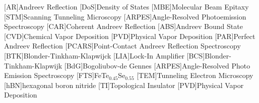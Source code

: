 [AR]{Andreev Reflection}
[DoS]{Density of States}
[MBE]{Molecular Beam Epitaxy}
[STM]{Scanning Tunneling Microscopy}
[ARPES]{Angle-Resolved Photoemission Spectroscopy}
[CAR]{Coherent Andreev Reflection}
[ABS]{Andreev Bound State}
[CVD]{Chemical Vapor Deposition}
[PVD]{Physical Vapor Deposition}
[PAR]{Perfect Andreev Reflection}
[PCARS]{Point-Contact Andreev Reflection Spectroscopy}
[BTK]{Blonder-Tinkham-Klapwijck}
[LIA]{Lock-In Amplifier}
[BCS]{Blonder-Tinkham-Klapwijk}
[BdG]{Bogoliubov-de Gennes}
[ARPES]{Angle-Resolved Photo Emission Spectroscopy}
[FTS]{FeTe$_{0.45}$Se$_{0.55}$}
[TEM]{Tunneling Electron Microscopy}
[hBN]{hexagonal boron nitride}
[TI]{Topological Insulator}
[PVD]{Physical Vapor Deposition}